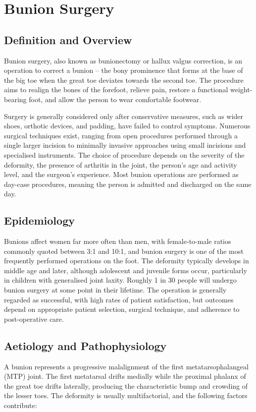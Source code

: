\chapter{Bunion Surgery}

\section*{Definition and Overview}
Bunion surgery, also known as bunionectomy or hallux valgus correction, is an operation to correct a bunion -- the bony prominence that forms at the base of the big toe when the great toe deviates towards the second toe. The procedure aims to realign the bones of the forefoot, relieve pain, restore a functional weight-bearing foot, and allow the person to wear comfortable footwear.

Surgery is generally considered only after conservative measures, such as wider shoes, orthotic devices, and padding, have failed to control symptoms. Numerous surgical techniques exist, ranging from open procedures performed through a single larger incision to minimally invasive approaches using small incisions and specialised instruments. The choice of procedure depends on the severity of the deformity, the presence of arthritis in the joint, the person's age and activity level, and the surgeon's experience. Most bunion operations are performed as day-case procedures, meaning the person is admitted and discharged on the same day.

\section*{Epidemiology}
Bunions affect women far more often than men, with female-to-male ratios commonly quoted between 3:1 and 10:1, and bunion surgery is one of the most frequently performed operations on the foot. The deformity typically develops in middle age and later, although adolescent and juvenile forms occur, particularly in children with generalised joint laxity. Roughly 1 in 30 people will undergo bunion surgery at some point in their lifetime. The operation is generally regarded as successful, with high rates of patient satisfaction, but outcomes depend on appropriate patient selection, surgical technique, and adherence to post-operative care.

\section*{Aetiology and Pathophysiology}
A bunion represents a progressive malalignment of the first metatarsophalangeal (MTP) joint. The first metatarsal drifts medially while the proximal phalanx of the great toe drifts laterally, producing the characteristic bump and crowding of the lesser toes. The deformity is usually multifactorial, and the following factors contribute:

